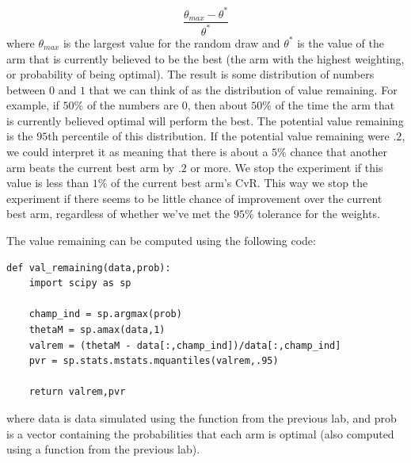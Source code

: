 \begin{equation}\label{valrem}
\frac{\theta_{max} - \theta^*}{\theta^*}
\end{equation}  
where $\theta_{max}$ is the largest value for the random draw and $\theta^*$ is the value of the arm that is currently believed to be the best (the arm with the highest weighting, or probability of being optimal).  The result is some distribution of numbers between $0$ and $1$ that we can think of as the distribution of value remaining.  For example, if $50\%$ of the numbers are 0, then about $50\%$ of the time the arm that is currently believed optimal will perform the best.  The potential value remaining is the $95$th percentile of this distribution.  If the potential value remaining were $.2$, we could interpret it as meaning that there is about a $5\%$ chance that another arm beats the current best arm by $.2$ or more.  We stop the experiment if this value is less than $1\%$ of the current best arm's CvR.  This way we stop the experiment if there seems to be little chance of improvement over the current best arm, regardless of whether we've met the $95\%$ tolerance for the weights.

The value remaining can be computed using the following code:

\begin{lstlisting}[style = python]
def val_remaining(data,prob):
    import scipy as sp
    
    champ_ind = sp.argmax(prob)
    thetaM = sp.amax(data,1)
    valrem = (thetaM - data[:,champ_ind])/data[:,champ_ind]
    pvr = sp.stats.mstats.mquantiles(valrem,.95)
    
    return valrem,pvr    
\end{lstlisting}
where data is data simulated using the function from the previous lab, and prob is a vector containing the probabilities that each arm is optimal (also computed using a function from the previous lab).

